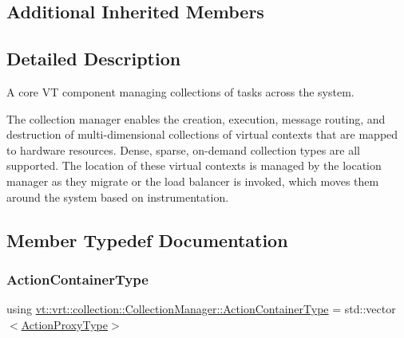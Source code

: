 \subsection*{Additional Inherited Members}


\subsection{Detailed Description}
A core VT component managing collections of tasks across the system. 

The collection manager enables the creation, execution, message routing, and destruction of multi-\/dimensional collections of virtual contexts that are mapped to hardware resources. Dense, sparse, on-\/demand collection types are all supported. The location of these virtual contexts is managed by the location manager as they migrate or the load balancer is invoked, which moves them around the system based on instrumentation. 

\subsection{Member Typedef Documentation}
\mbox{\label{structvt_1_1vrt_1_1collection_1_1_collection_manager_a536805fb5c58b557b66e7d7febe87567}} 
\subsubsection{\texorpdfstring{Action\+Container\+Type}{ActionContainerType}}
{\footnotesize\ttfamily using \hyperlink{structvt_1_1vrt_1_1collection_1_1_collection_manager_a536805fb5c58b557b66e7d7febe87567}{vt\+::vrt\+::collection\+::\+Collection\+Manager\+::\+Action\+Container\+Type} =  std\+::vector$<$\hyperlink{structvt_1_1vrt_1_1collection_1_1_collection_manager_a98a759caf144277dcd341cdbd5538f59}{Action\+Proxy\+Type}$>$}

\mbox{\label{structvt_1_1vrt_1_1collection_1_1_collection_manager_a61252b0d805cdb8fdea35439de468001}} 
